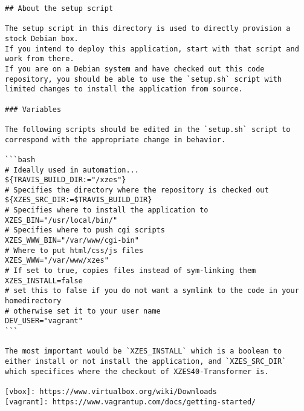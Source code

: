 \begin{lstlisting}
## About the setup script

The setup script in this directory is used to directly provision a stock Debian box.
If you intend to deploy this application, start with that script and work from there.
If you are on a Debian system and have checked out this code repository, you should be able to use the `setup.sh` script with limited changes to install the application from source.

### Variables

The following scripts should be edited in the `setup.sh` script to correspond with the appropriate change in behavior.

```bash
# Ideally used in automation...
${TRAVIS_BUILD_DIR:="/xzes"}
# Specifies the directory where the repository is checked out
${XZES_SRC_DIR:=$TRAVIS_BUILD_DIR}
# Specifies where to install the application to
XZES_BIN="/usr/local/bin/"
# Specifies where to push cgi scripts
XZES_WWW_BIN="/var/www/cgi-bin"
# Where to put html/css/js files
XZES_WWW="/var/www/xzes"
# If set to true, copies files instead of sym-linking them
XZES_INSTALL=false
# set this to false if you do not want a symlink to the code in your homedirectory
# otherwise set it to your user name
DEV_USER="vagrant"
```

The most important would be `XZES_INSTALL` which is a boolean to either install or not install the application, and `XZES_SRC_DIR` which specifices where the checkout of XZES40-Transformer is.

[vbox]: https://www.virtualbox.org/wiki/Downloads
[vagrant]: https://www.vagrantup.com/docs/getting-started/
\end{lstlisting}
